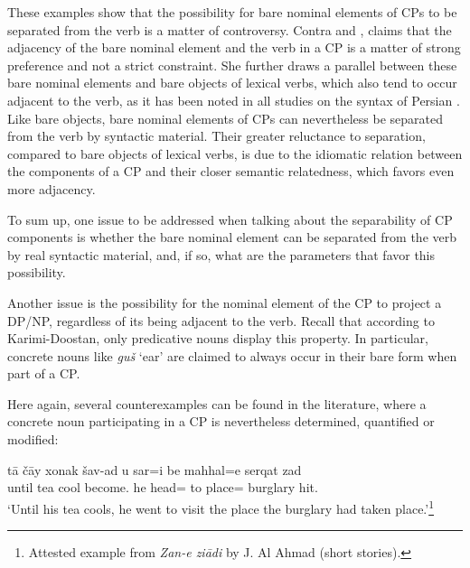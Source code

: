 \documentclass[output=paper]{langsci/langscibook}
\begin{document}
These examples show that the possibility for bare nominal elements of CPs to be separated from the verb is a matter of controversy. Contra \citet{Goldberg1996} and \citet{Karimi-Doostan1997,Karimi-Doostan:2011}, \citet{Samvelian2012} claims that the adjacency of the bare nominal element and the verb in a CP is a matter of strong preference and not a strict constraint. She further draws a parallel between these bare nominal elements and bare objects of lexical verbs, which also tend to occur adjacent to the verb, as it has been noted in all studies on the syntax of Persian \citep[][among many others]{dabir1997compound,givi,ghomeshi1996phd,lazard82,mahootian97,Samvelian2001,Karimi2003}. 
Like bare objects, bare nominal elements of CPs can nevertheless be separated from the verb by syntactic material. Their greater reluctance to separation, compared to bare objects of lexical verbs, is due to the idiomatic relation between the components of a CP and their closer semantic relatedness, which favors even more adjacency. 

To sum up, one issue to be addressed when talking about the separability of CP components is whether the bare nominal element can be separated from the verb by real syntactic material, and, if so, what are the parameters that favor this possibility. 

Another issue is the possibility for the nominal element of the CP to project a DP/NP, regardless of its being adjacent to the verb. Recall that according to Karimi-Doostan, only predicative nouns display this property. In particular, concrete nouns like \textit{gu\v{s}} `ear' are claimed to always occur in their bare form when part of a CP.

Here again, several counterexamples can be found in the literature, where a concrete noun participating in a CP is nevertheless determined, quantified or modified:\largerpage

\begin{exe}
	\ex\label{samvelian-concrete}
	\gll t\=a \v{c}\=ay xonak \v{s}av-ad u sar=i be mahhal=e serqat zad \\
	until tea cool become. he head=  to place= burglary hit.\\
	\glt `Until his tea cools, he went to visit the place the burglary had taken place.'\footnote{Attested example from \textit{Zan-e zi\=adi} by J. Al Ahmad (short stories).} 	\hfill \citep[][p.~85, ex.~68]{Samvelian2012}
\end{exe}
\end{document}
